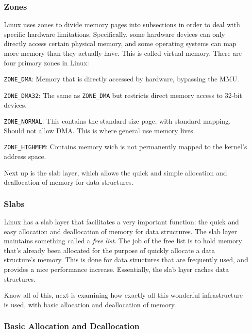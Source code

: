 \documentclass[10pt,letterpaper,onecolumn,draftclsnofoot]{IEEEtran}
\begin{document}
\subsubsection{Zones}
Linux uses zones to divide memory pages into subsections in order to
deal with specific hardware limitations. Specifically, some hardware
devices can only directly access certain physical memory, and some 
operating systems can map more memory than they actually have. This is
called virtual memory. There are four primary zones in Linux:
\begin{description}
	\item \texttt{ZONE\_DMA}: Memory that is directly accessed by
	hardware, bypassing the MMU. 
	\item \texttt{ZONE\_DMA32}: The same as \texttt{ZONE\_DMA} but
	restricts direct memory access to 32-bit devices. 
	\item \texttt{ZONE\_NORMAL}: This contains the standard size
	page, with standard mapping. Should not allow DMA. This
	is where general use memory lives.
	\item \texttt{ZONE\_HIGHMEM}: Contains memory wich is not 
	permanently mapped to the kernel's address space.
\end{description}
\cite{robertlove2010}
Next up is the slab layer, which allows the quick and simple allocation
and deallocation of memory for data structures. 
\subsubsection{Slabs}
Linux has a slab layer that facilitates a very important function: the
quick and easy allocation and deallocation of memory for data
structures. The slab layer maintains something called a \textit{free list}.
The job of the free list is to hold memory that's already been allocated
for the purpose of quickly allocate a data structure's memory. This is
done for data structures that are frequently used, and provides a nice
performance increase. Essentially, the slab layer caches data structures.
\cite{robertlove2010}

Know all of this, next is examining how exactly all this wonderful
infrastructure is used, with basic allocation and deallocation of memory.

\subsubsection{Basic Allocation and Deallocation}
\end{document}
